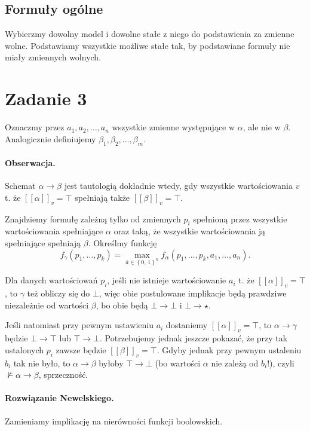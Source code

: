 \subsection*{Formuły ogólne} Wybierzmy dowolny model i dowolne stałe z niego do podstawienia za zmienne wolne. Podstawiamy wszystkie możliwe stałe tak, by podstawiane formuły nie miały zmiennych wolnych. 

\section*{Zadanie 3}

Oznaczmy przez \( a_1, a_2, \ldots, a_n \) wszystkie zmienne występujące w \( \alpha \), ale nie w \( \beta \). Analogicznie definiujemy \( \beta_1, \beta_2, \ldots, \beta_m \). 

\paragraph{Obserwacja.} Schemat \( \alpha \to \beta \) jest tautologią dokładnie wtedy, gdy wszystkie wartościowania \( v \) t. że \( [[\alpha ]]_v = \top \) spełniają także \( [[\beta ]]_v = \top\).

Znajdziemy formułę zależną tylko od zmiennych \( p_i \) spełnioną przez wszystkie wartościowania spełniające \( \alpha \) oraz taką, że wszystkie wartościowania ją spełniające spełniają \( \beta \). Określmy funkcję
\[ 
    f_\gamma (p_1, \ldots, p_k) = \max\limits_{\overline{a} \in \left\{ 0,\, 1 \right\}^n } f_\alpha(p_1, \ldots, p_k, a_1, \ldots, a_n).
\]

Dla danych wartościowań \( p_i \), jeśli nie istnieje wartościowanie \( a_i \) t. że \( [[\alpha]]_v = \top \), to \( \gamma \) też obliczy się do \( \bot \), więc obie postulowane implikacje będą prawdziwe niezależnie od wartości \( \beta \), bo obie będą \( \bot \to \bot \) i \( \bot \to \star \). 

Jeśli natomiast przy pewnym ustawieniu \( a_i \) dostaniemy \( [[\alpha]]_v = \top \), to \( \alpha \to \gamma \) będzie \( \bot \to \top \) lub \( \top \to \bot \). Potrzebujemy jednak jeszcze pokazać, że przy tak ustalonych \( p_i \) zawsze będzie \( [[\beta]]_v = \top \). Gdyby jednak przy pewnym ustaleniu \( b_i \) tak nie było, to \( \alpha \to \beta \) byłoby \( \top \to \bot \) (bo wartości \( \alpha \) nie zależą od \( b_i \)!), czyli \( \not\models \alpha \to \beta \), sprzeczność.

\paragraph{Rozwiązanie Newelskiego.} Zamieniamy implikację na nierówności funkcji boolowskich.


